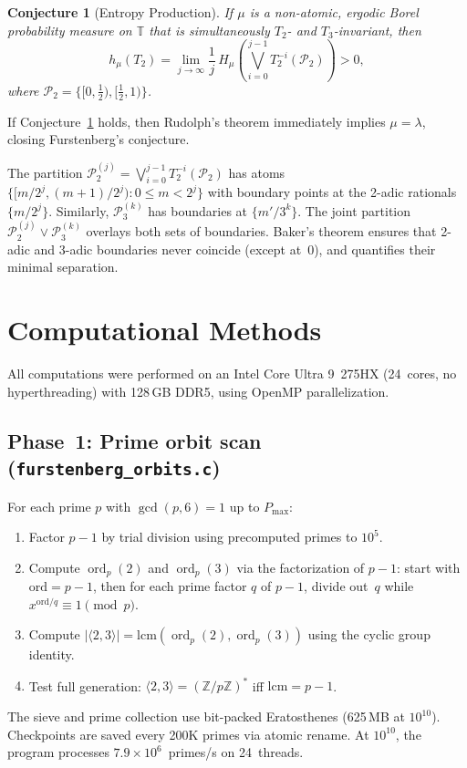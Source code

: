 \documentclass[11pt,a4paper]{article}
\newtheorem{conjecture}{Conjecture}
\DeclareMathOperator{\ord}{ord}
\begin{document}
\begin{conjecture}[Entropy Production]
\label{conj:entropy}
If $\mu$ is a non-atomic, ergodic Borel probability measure on $\mathbb{T}$
that is simultaneously $T_2$- and $T_3$-invariant, then
\[
h_\mu(T_2) = \lim_{j \to \infty} \frac{1}{j}\, H_\mu\!\!\left(
\bigvee_{i=0}^{j-1} T_2^{-i}(\mathcal{P}_2)\right) > 0,
\]
where $\mathcal{P}_2 = \{[0, \tfrac12), [\tfrac12, 1)\}$.
\end{conjecture}

If Conjecture~\ref{conj:entropy} holds, then Rudolph's theorem
immediately implies $\mu = \lambda$, closing Furstenberg's conjecture.

The partition $\mathcal{P}_2^{(j)} = \bigvee_{i=0}^{j-1} T_2^{-i}(\mathcal{P}_2)$
has atoms $\{[m/2^j, (m+1)/2^j) : 0 \leq m < 2^j\}$ with boundary
points at the 2-adic rationals $\{m/2^j\}$.
Similarly, $\mathcal{P}_3^{(k)}$ has boundaries at $\{m'/3^k\}$.
The joint partition $\mathcal{P}_2^{(j)} \vee \mathcal{P}_3^{(k)}$ overlays
both sets of boundaries.
Baker's theorem ensures that 2-adic and 3-adic boundaries never coincide
(except at~0), and quantifies their minimal separation.


\section{Computational Methods}

All computations were performed on an Intel Core Ultra 9~275HX
(24~cores, no hyperthreading) with 128\,GB DDR5, using OpenMP
parallelization.

\subsection{Phase~1: Prime orbit scan (\texttt{furstenberg\_orbits.c})}

For each prime $p$ with $\gcd(p, 6) = 1$ up to $P_{\max}$:
\begin{enumerate}
\item Factor $p - 1$ by trial division using precomputed primes to $10^5$.
\item Compute $\ord_p(2)$ and $\ord_p(3)$ via the factorization of $p-1$:
  start with $\text{ord} = p-1$, then for each prime factor $q$ of $p-1$,
  divide out~$q$ while $x^{\text{ord}/q} \equiv 1 \pmod{p}$.
\item Compute $|\langle 2, 3 \rangle| = \text{lcm}(\ord_p(2), \ord_p(3))$
  using the cyclic group identity.
\item Test full generation: $\langle 2, 3 \rangle = (\mathbb{Z}/p\mathbb{Z})^*$
  iff $\text{lcm} = p - 1$.
\end{enumerate}
The sieve and prime collection use bit-packed Eratosthenes (625\,MB at
$10^{10}$).
Checkpoints are saved every 200K primes via atomic rename.
At $10^{10}$, the program processes $7.9 \times 10^6$~primes/s
on 24~threads.
\end{document}
